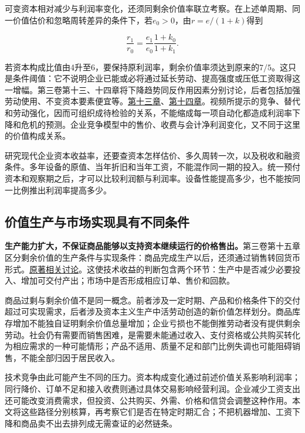 \documentclass[UTF8,fontset=windows,12pt,a4paper,oneside,openany]{ctexbook}
\begin{document}
可变资本相对减少与利润率变化，还须同剩余价值率联立考察。在上述单周期、同一价值估价和忽略周转差异的条件下，若$e_0>0$，由$r=e/(1+k)$得到

\[
\frac{r_1}{r_0}=\frac{e_1}{e_0}\frac{1+k_0}{1+k_1}.
\tag{2-V4}
\]

若资本构成比值由4升至6，要保持原利润率，剩余价值率须达到原来的$7/5$。这只是条件阈值：它不说明企业已能或必将通过延长劳动、提高强度或压低工资取得这一增幅。第三卷第十三、十四章将下降趋势同反作用因素分别讨论，后者包括加强劳动使用、不变资本要素便宜等。\href{https://www.marxists.org/archive/marx/works/1894-c3/ch13.htm}{第十三章}、\href{https://www.marxists.org/archive/marx/works/1894-c3/ch14.htm}{第十四章}。视频所提示的竞争、替代和劳动强化，因而可组织成待检验的关系，不能缩成每一项自动化都造成利润率下降和危机的预测。企业竞争模型中的售价、收费与会计净利润变化，又不同于这里的价值构成关系。

研究现代企业资本收益率，还要查资本怎样估价、多久周转一次，以及税收和融资条件。多年设备的原值、当年折旧和当年工资，不能混作同一期的投入。统一预付资本和观察期之后，才可以比较利润额与利润率。设备性能提高多少，也不能按同一比例推出利润率提高多少。

\subsection{价值生产与市场实现具有不同条件}\label{sec:production-realization}

\textbf{生产能力扩大，不保证商品能够以支持资本继续运行的价格售出。}第三卷第十五章区分剩余价值的生产条件与实现条件：商品完成生产以后，还须通过销售转回货币形式。\href{https://www.marxists.org/archive/marx/works/1894-c3/ch15.htm}{原著相关讨论}。这使技术收益的判断包含两个环节：生产中是否减少必要投入、增加可交付产出；市场中是否形成相应订单、售价和回款。

商品过剩与剩余价值不是同一概念。前者涉及一定时期、产品和价格条件下的交付超过可实现需求，后者涉及资本主义生产中活劳动创造的新价值怎样划分。商品库存增加不能独自证明剩余价值总量增加；企业亏损也不能倒推劳动者没有提供剩余劳动。社会仍有需要而销售困难，是需要未能通过收入、支付资格或公共购买转化为相应需求的一种可能情形；产品不适用、质量不足和部门比例失调也可能阻碍销售，不能全部归因于居民收入。

技术竞争由此可能产生不同的压力。资本构成变化通过前述价值关系影响利润率；同行降价、订单不足和接入收费则通过具体交易影响经营利润。企业减少工资支出还可能改变消费需求，但投资、公共购买、外需、价格和信贷会调整这种作用。本文将这些路径分别核算，再考察它们是否在特定时期汇合；不把机器增加、工资下降和商品卖不出去排列成无需查证的必然链条。
\end{document}
